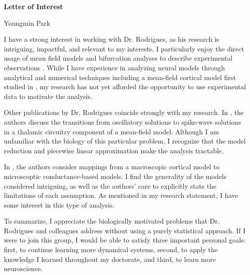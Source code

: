\documentclass[a4paper,11pt]{article}
\begin{document}
\begin{center}
\Large \textbf{Letter of Interest}

\Large Youngmin Park
\end{center}

I have a strong interest in working with Dr. Rodrigues, as his research is intriguing, impactful, and relevant to my interests. I particularly enjoy the direct usage of mean field models and bifurcation analyses to describe experimental observations \cite{rodrigues2009transitions,breakspear2005unifying}. While I have experience in analyzing neural models through analytical and numerical techniques \cite{park2016weakly,park2016infinitesimal} including a mean-field cortical model first studied in \cite{pinto_ermentrout_2001_siam}, my research has not yet afforded the opportunity to use experimental data to motivate the analysis.

Other publications by Dr. Rodrigues coincide strongly with my research. In \cite{rodrigues2006genesis}, the authors discuss the transitions from oscillatory solutions to spike-wave solutions in a thalamic circuitry component of a mean-field model. Although I am unfamiliar with the biology of this particular problem, I recognize that the model reduction and piecewise linear approximation make the analysis tractable.

In \cite{rodrigues2010mappings}, the authors consider mappings from a macroscopic cortical model to microscoptic conductance-based models. I find the generality of the models considered intriguing, as well as the authors' care to explicitly state the limitations of each assumption. As mentioned in my research statement, I have some interest in this type of analysis.

To summarize, I appreciate the biologically motivated problems that Dr. Rodrigues and colleagues address without using a purely statistical approach. If I were to join this group, I would be able to satisfy three important personal goals: first, to continue learning more dynamical systems, second, to apply the knowledge I learned throughout my doctorate, and third, to learn more neuroscience.



\end{document}
